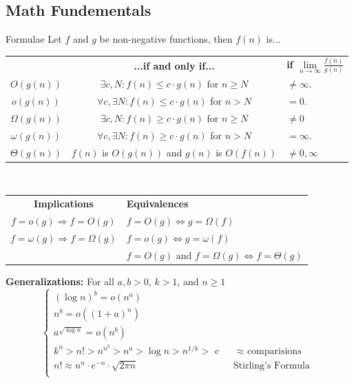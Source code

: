 \documentclass[10pt,a4paper]{article}
\begin{document}
\small
\begin{multicols}{3}

\scriptsize

\section{Math Fundementals}
\begin{textbox}{Formulae}
 Let $f$ and $g$ be non-negative functions, then $f(n)$ is...\\

\begin{tabular}{c|c|p{}}
     & {\bf...if and only if...} & {\bf if $\lim\limits_{n \to \infty} \frac{f(n)}{g(n)}$}  \\
    $O(g(n))$ & $\exists c,N:f(n)\leq c\cdot g(n)$ for $n\geq N$ & $\neq \infty$.  \\
    $o(g(n))$ & $\forall c,\exists N:f(n)\leq c\cdot g(n)$ for $n>N$ & $= 0$. \\
    $\Omega(g(n))$ & $\exists c,N:f(n)\geq c\cdot g(n)$ for $n\geq N$ & $\neq 0$ \\
    $\omega(g(n))$ & $\forall c,\exists N:f(n)\geq c\cdot g(n)$ for $n>N$ & $= \infty$. \\
    $\Theta(g(n))$ & $f(n)$ is $O(g(n))$ and $g(n)$ is $O(f(n))$ & $\neq 0, \infty$ \\
\end{tabular}\\
\linebreak
\begin{tabular}{c|p{}}
    {\bf Implications} &  {\bf Equivalences} \\
    $f = o(g) \Rightarrow f = O(g)$ & $f = O(g) \Leftrightarrow g = \Omega(f)$ \\
    $f = \omega(g) \Rightarrow f = \Omega(g)$ & $f = o(g) \Leftrightarrow g = \omega(f)$ \\
     & $f = O(g) \text{ and } f = \Omega(g) \Leftrightarrow f = \Theta(g)$ \\
\end{tabular}
\linebreak
{\bf Generalizations:} For all $a, b > 0$, $k > 1$, and $n \geq 1$ 
\[\begin{cases}
    (\log n)^b = o(n^a)\\
    n^b = o((1 + a)^n) \\
    a^{\sqrt{\log n}} = o(n^b) \\
    k^n > n! > n^{n^b} > n^a > \log n > n^{1/k} > \text{ c } & \text{ $\approx$ comparisions} \\
    n! \approx n^n \cdot e^{-n} \cdot \sqrt{2\pi n} & \text{ Stirling's Formula }\\
\end{cases}\]


\end{textbox}
\end{multicols}
\end{document}
